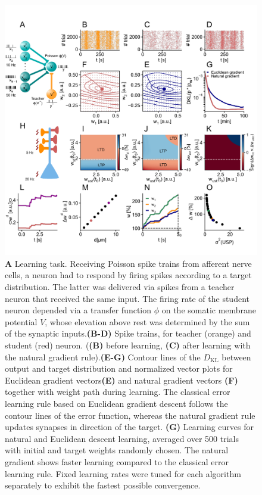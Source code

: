\documentclass[12pt]{article}
\newcommand{\DKL}{D_\mrm{KL}}
\newcommand{\mrm}{\mathrm}
\begin{document}
\begin{figure}
\center
\includegraphics[scale=1.0]{Figure_Cosyne2}
\vspace{-0.7cm}
\caption{\footnotesize{\bf A} Learning task. Receiving Poisson spike trains from afferent nerve cells, a neuron had to respond by firing spikes according to a target distribution. The latter was delivered via spikes from a teacher neuron that received the same input. The firing rate of the student neuron depended via a transfer function $\phi$ on the somatic membrane potential $V$, whose elevation above rest was determined by the sum of the synaptic inputs.{\bf(B-D)} Spike trains, for teacher (orange) and student (red) neuron. ({\bf(B)} before learning, {\bf (C)} after learning with the natural gradient rule).{\bf{(E-G)}} Contour lines of the $\DKL$ between output and target distribution and normalized vector plots for Euclidean gradient vectors{\bf(E)} and natural gradient vectors {\bf(F)} together with weight path during learning. The classical error learning rule based on Euclidean gradient descent follows the contour lines of the error function, whereas the natural gradient rule updates synapses in direction of the target.%
{\bf(G)} Learning curves for natural and Euclidean descent learning, averaged over \num{500} trials with initial and target weights randomly chosen. The natural gradient shows faster learning compared to the classical error learning rule. Fixed learning rates were tuned for each algorithm separately to exhibit the fastest possible convergence.%
}
\end{figure}
\end{document}
